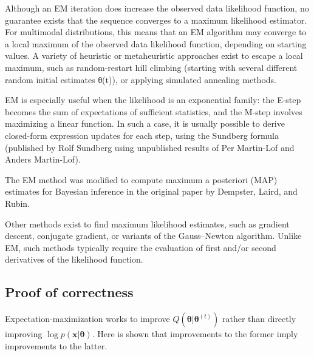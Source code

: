 Although an EM iteration does increase the observed data likelihood function, no guarantee exists that the sequence converges to a maximum likelihood estimator. For multimodal distributions, this means that an EM algorithm may converge to a local maximum of the observed data likelihood function, depending on starting values. A variety of heuristic or metaheuristic approaches exist to escape a local maximum, such as random-restart hill climbing (starting with several different random initial estimates θ(t)), or applying simulated annealing methods.

EM is especially useful when the likelihood is an exponential family: the E-step becomes the sum of expectations of sufficient statistics, and the M-step involves maximizing a linear function. In such a case, it is usually possible to derive closed-form expression updates for each step, using the Sundberg formula (published by Rolf Sundberg using unpublished results of Per Martin-Lof and Anders Martin-Lof).

The EM method was modified to compute maximum a posteriori (MAP) estimates for Bayesian inference in the original paper by Dempster, Laird, and Rubin.

Other methods exist to find maximum likelihood estimates, such as gradient descent, conjugate gradient, or variants of the Gauss–Newton algorithm. Unlike EM, such methods typically require the evaluation of first and/or second derivatives of the likelihood function.


\subsection{Proof of correctness}

Expectation-maximization works to improve $Q(\boldsymbol\theta|\boldsymbol\theta^{(t)})$ rather than directly improving $\log p(\boldsymbol x|\boldsymbol\theta)$. Here is shown that improvements to the former imply improvements to the latter.

